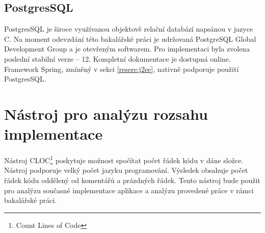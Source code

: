     \subsection{PostgresSQL}
        PostgresSQL je široce využívanou objektově relační databází napsánou v jazyce C. Na moment odevzdání této bakalářské práci je udržovaná PostgreSQL Global Development Group a je otevřeným softwarem. Pro implementaci byla zvolena poslední stabilní verze -- 12. Kompletní dokumentace je dostupná online\cite{postgres-documentation}. Framework Spring, zmíněný v sekci \ref{resere:j2ee}, nativně podporuje použití PostgresSQL.
        

\section{Nástroj pro analýzu rozsahu implementace}\label{reserse:cloc}
    Nástroj CLOC\footnote{Count Lines of Code}\cite{cloc-download} poskytuje možnost spočítat počet řádek kódu v dáne složce. Nástroj podporuje velký počet jazyku programování. Výsledek obsahuje počet řádek kódu oddělený od komentářů a prázdných řádek. Tento nástroj bude použit pro analýzu současné implementace aplikace a analýzu provedené práce v rámci bakalářské práci.